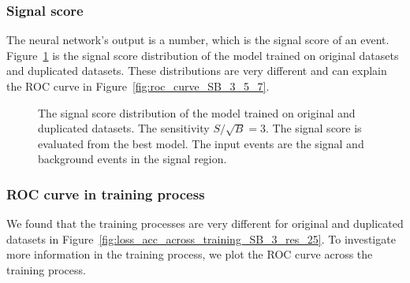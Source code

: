 \documentclass[12pt]{article}
\begin{document}
		\subsubsection{Signal score}%
		\label{subs:signal_score}
			The neural network's output is a number, which is the signal score of an event. Figure~\ref{fig:signal_score_SB_3} is the signal score distribution of the model trained on original datasets and duplicated datasets. These distributions are very different and can explain the ROC curve in Figure~\ref{fig:roc_curve_SB_3_5_7}.
			\begin{figure}[htpb]
				\centering
				\caption{The signal score distribution of the model trained on original and duplicated datasets. The sensitivity $S / \sqrt{B} = 3$. The signal score is evaluated from the best model. The input events are the signal and background events in the signal region.}
				\label{fig:signal_score_SB_3}
			\end{figure}
		\subsubsection{ROC curve in training process}%
		\label{subs:roc_curve_in_training_process}
			We found that the training processes are very different for original and duplicated datasets in Figure~\ref{fig:loss_acc_across_training_SB_3_res_25}. To investigate more information in the training process, we plot the ROC curve across the training process.
\end{document}
